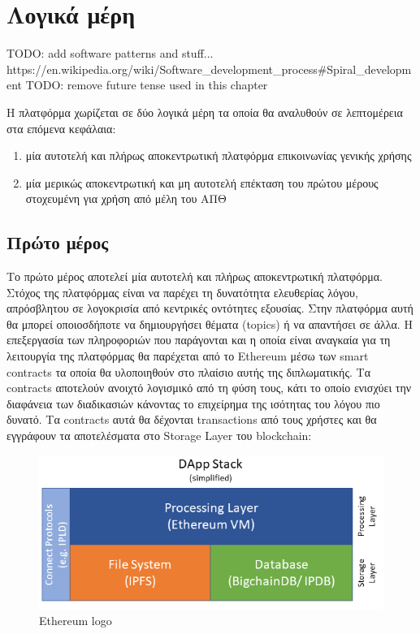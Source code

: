 \section{Λογικά μέρη} \label{section:3-1-logical-parts}

TODO: add software patterns and stuff...
https://en.wikipedia.org/wiki/Software_development_process#Spiral_development
TODO: remove future tense used in this chapter

Η πλατφόρμα χωρίζεται σε δύο λογικά μέρη τα οποία θα αναλυθούν σε λεπτομέρεια στα επόμενα κεφάλαια:

\begin{enumerate}
    \item μία αυτοτελή και πλήρως αποκεντρωτική πλατφόρμα επικοινωνίας γενικής χρήσης
    \item μία μερικώς αποκεντρωτική και μη αυτοτελή επέκταση του πρώτου μέρους στοχευμένη για χρήση από μέλη του ΑΠΘ
\end{enumerate}

\subsection{Πρώτο μέρος} \label{subsection:3-1-first-part}

Το πρώτο μέρος αποτελεί μία αυτοτελή και πλήρως αποκεντρωτική πλατφόρμα. Στόχος της πλατφόρμας είναι να παρέχει τη
δυνατότητα ελευθερίας λόγου, απρόσβλητου σε λογοκρισία από κεντρικές οντότητες εξουσίας. Στην πλατφόρμα αυτή θα μπορεί
οποιοσδήποτε να δημιουργήσει θέματα (topics) ή να απαντήσει σε άλλα. Η επεξεργασία των πληροφοριών που παράγονται και η
οποία είναι αναγκαία για τη λειτουργία της πλατφόρμας θα παρέχεται από το Ethereum μέσω των smart contracts τα οποία θα
υλοποιηθούν στο πλαίσιο αυτής της διπλωματικής. Τα contracts αποτελούν ανοιχτό λογισμικό από τη φύση τους, κάτι το οποίο
ενισχύει την διαφάνεια των διαδικασιών κάνοντας το επιχείρημα της ισότητας του λόγου πιο δυνατό. Τα contracts αυτά θα
δέχονται transactions από τους χρήστες και θα εγγράφουν τα αποτελέσματα στο Storage Layer του blockchain:

\begin{figure}[H]
    \centering
    \includegraphics[width=.75\textwidth]{assets/figures/chapter-3/simple_dapp_stack}
    \caption{Ethereum logo}
\end{figure}

